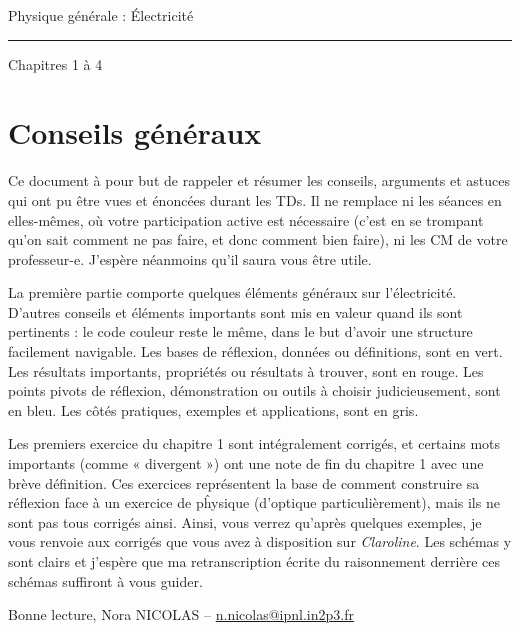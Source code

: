 \documentclass[10pt,a5paper,notitlepage]{book}
\begin{document}
\begin{center}
\Huge Physique générale : Électricité\smallbreak\vspace*{-14pt}
\rule[11pt]{5cm}{0.5pt}\smallbreak\vspace*{-14pt}
\huge Chapitres 1 à 4
\end{center}

\toccontents

\setcounter{chapter}{-1}
\chapter{Conseils généraux}
\vspace*{-47pt}
Ce document à pour but de rappeler et résumer les conseils, arguments et astuces
qui ont pu être vues et énoncées durant les TDs. Il ne remplace ni les séances
en elles-mêmes, où votre participation active est nécessaire (c'est en se
trompant qu'on sait comment ne pas faire, et donc comment bien faire), ni les CM
de votre professeur-e. J'espère néanmoins qu'il saura vous être utile.
\smallbreak

La première partie comporte quelques éléments généraux sur l'électricité.
D'autres conseils et éléments importants sont mis en valeur quand ils sont
pertinents : le code couleur reste le même, dans le but d'avoir une structure
facilement navigable. Les bases de réflexion, données ou définitions, sont en
vert. Les résultats importants, propriétés ou résultats à trouver, sont en
rouge. Les points pivots de réflexion, démonstration ou outils à choisir
judicieusement, sont en bleu. Les côtés pratiques, exemples et applications,
sont en gris. \smallbreak

Les premiers exercice du chapitre 1 sont intégralement corrigés, et certains
mots importants (comme « divergent ») ont une note de fin du chapitre 1 avec une
brève définition. Ces exercices représentent la base de comment construire sa
réflexion face à un exercice de pĥysique (d'optique particulièrement), mais ils
ne sont pas tous corrigés ainsi. Ainsi, vous verrez qu'après quelques exemples,
je vous renvoie aux corrigés que vous avez à disposition sur \textit{Claroline}.
Les schémas y sont clairs et j'espère que ma retranscription écrite du
raisonnement derrière ces schémas suffiront à vous guider. \smallbreak

Bonne lecture, \hfill Nora NICOLAS --
\href{mailto:n.nicolas@ipnl.in2p3.fr}{n.nicolas@ipnl.in2p3.fr}\\
\end{document}
